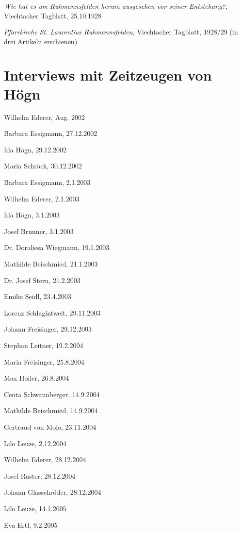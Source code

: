 \textit{Wie hat es um Ruhmannsfelden herum ausgesehen vor seiner
Entstehung?,} Viechtacher Tagblatt, 25.10.1928

\textit{Pfarrkirche St. Laurentius Ruhmannsfelden,} Viechtacher
Tagblatt, 1928/29 (in drei Artikeln erschienen)

\section{Interviews mit Zeitzeugen von Högn}

\begin{multicols}{2}
\begin{compactitem}
\raggedright
\item Wilhelm Ederer, Aug. 2002
\item Barbara Essigmann, 27.12.2002
\item Ida Högn, 29.12.2002
\item Maria Schröck, 30.12.2002
\item Barbara Essigmann, 2.1.2003
\item Wilhelm Ederer, 2.1.2003
\item Ida Högn, 3.1.2003
\item Josef Brunner, 3.1.2003
\item Dr. Doraliesa Wiegmann, 19.1.2003
\item Mathilde Beischmied, 21.1.2003
\item Dr. Josef Stern, 21.2.2003
\item Emilie Seidl, 23.4.2003
\item Lorenz Schlagintweit, 29.11.2003
\item Johann Freisinger, 29.12.2003
\item Stephan Leitner, 19.2.2004
\item Maria Freisinger, 25.8.2004
\item Max Holler, 26.8.2004
\item Centa Schwannberger, 14.9.2004
\item Mathilde Beischmied, 14.9.2004
\item Gertraud von Molo, 23.11.2004
\item Lilo Leuze, 2.12.2004
\item Wilhelm Ederer, 28.12.2004
\item Josef Raster, 28.12.2004
\item Johann Glasschröder, 28.12.2004
\item Lilo Leuze, 14.1.2005
\item Eva Ertl, 9.2.2005
\end{compactitem}
\end{multicols}

